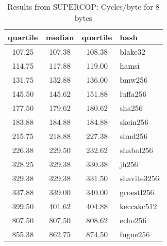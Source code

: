 \begin{table}
  \centering
  \begin{tabular}{ | c | c | c | l | }
    \hline
    \textbf{quartile} & \textbf{median} & \textbf{quartile} & \textbf{hash} \\ \hline
    107.25 & 107.38 & 108.38 & blake32 \\ \hline
    114.75 & 117.88 & 119.00 & hamsi \\ \hline
    131.75 & 132.88 & 136.00 & bmw256 \\ \hline
    145.50 & 145.62 & 151.88 & luffa256 \\ \hline
    177.50 & 179.62 & 180.62 & sha256 \\ \hline
    183.88 & 184.88 & 184.88 & skein256 \\ \hline
    215.75 & 218.88 & 227.38 & simd256 \\ \hline
    226.38 & 229.50 & 232.62 & shabal256 \\ \hline
    328.25 & 329.38 & 330.38 & jh256 \\ \hline
    329.38 & 329.38 & 331.50 & shavite3256 \\ \hline
    337.88 & 339.00 & 340.00 & groestl256 \\ \hline
    399.50 & 401.62 & 404.88 & keccakc512 \\ \hline
    807.50 & 807.50 & 808.62 & echo256 \\ \hline
    855.38 & 862.75 & 874.50 & fugue256 \\ \hline
  \end{tabular}
  \caption{Results from SUPERCOP: Cycles/byte for 8 bytes}
  \label{tbl:supercop:8}
\end{table}
